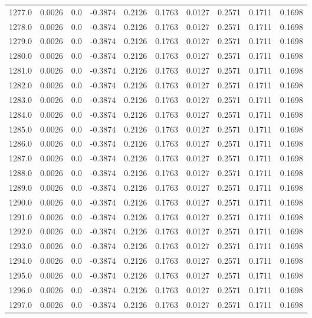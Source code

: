 \begin{longtable}{lrrrrrrrrr}
1277.0 & 0.0026 & 0.0 & -0.3874 & 0.2126 & 0.1763 & 0.0127 & 0.2571 & 0.1711 & 0.1698 \\
1278.0 & 0.0026 & 0.0 & -0.3874 & 0.2126 & 0.1763 & 0.0127 & 0.2571 & 0.1711 & 0.1698 \\
1279.0 & 0.0026 & 0.0 & -0.3874 & 0.2126 & 0.1763 & 0.0127 & 0.2571 & 0.1711 & 0.1698 \\
1280.0 & 0.0026 & 0.0 & -0.3874 & 0.2126 & 0.1763 & 0.0127 & 0.2571 & 0.1711 & 0.1698 \\
1281.0 & 0.0026 & 0.0 & -0.3874 & 0.2126 & 0.1763 & 0.0127 & 0.2571 & 0.1711 & 0.1698 \\
1282.0 & 0.0026 & 0.0 & -0.3874 & 0.2126 & 0.1763 & 0.0127 & 0.2571 & 0.1711 & 0.1698 \\
1283.0 & 0.0026 & 0.0 & -0.3874 & 0.2126 & 0.1763 & 0.0127 & 0.2571 & 0.1711 & 0.1698 \\
1284.0 & 0.0026 & 0.0 & -0.3874 & 0.2126 & 0.1763 & 0.0127 & 0.2571 & 0.1711 & 0.1698 \\
1285.0 & 0.0026 & 0.0 & -0.3874 & 0.2126 & 0.1763 & 0.0127 & 0.2571 & 0.1711 & 0.1698 \\
1286.0 & 0.0026 & 0.0 & -0.3874 & 0.2126 & 0.1763 & 0.0127 & 0.2571 & 0.1711 & 0.1698 \\
1287.0 & 0.0026 & 0.0 & -0.3874 & 0.2126 & 0.1763 & 0.0127 & 0.2571 & 0.1711 & 0.1698 \\
1288.0 & 0.0026 & 0.0 & -0.3874 & 0.2126 & 0.1763 & 0.0127 & 0.2571 & 0.1711 & 0.1698 \\
1289.0 & 0.0026 & 0.0 & -0.3874 & 0.2126 & 0.1763 & 0.0127 & 0.2571 & 0.1711 & 0.1698 \\
1290.0 & 0.0026 & 0.0 & -0.3874 & 0.2126 & 0.1763 & 0.0127 & 0.2571 & 0.1711 & 0.1698 \\
1291.0 & 0.0026 & 0.0 & -0.3874 & 0.2126 & 0.1763 & 0.0127 & 0.2571 & 0.1711 & 0.1698 \\
1292.0 & 0.0026 & 0.0 & -0.3874 & 0.2126 & 0.1763 & 0.0127 & 0.2571 & 0.1711 & 0.1698 \\
1293.0 & 0.0026 & 0.0 & -0.3874 & 0.2126 & 0.1763 & 0.0127 & 0.2571 & 0.1711 & 0.1698 \\
1294.0 & 0.0026 & 0.0 & -0.3874 & 0.2126 & 0.1763 & 0.0127 & 0.2571 & 0.1711 & 0.1698 \\
1295.0 & 0.0026 & 0.0 & -0.3874 & 0.2126 & 0.1763 & 0.0127 & 0.2571 & 0.1711 & 0.1698 \\
1296.0 & 0.0026 & 0.0 & -0.3874 & 0.2126 & 0.1763 & 0.0127 & 0.2571 & 0.1711 & 0.1698 \\
1297.0 & 0.0026 & 0.0 & -0.3874 & 0.2126 & 0.1763 & 0.0127 & 0.2571 & 0.1711 & 0.1698 \\

\end{longtable}

